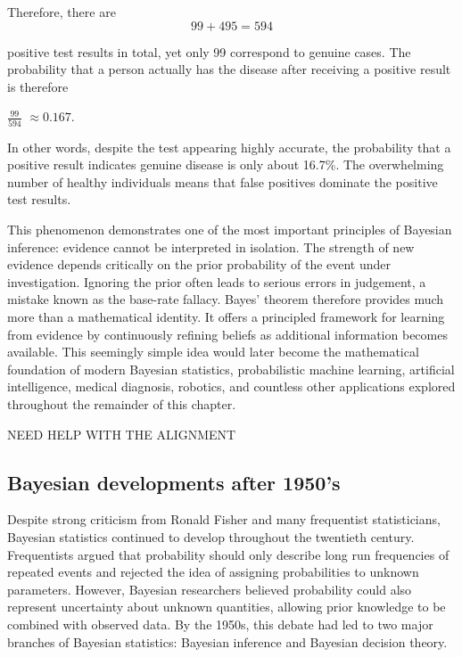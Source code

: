 Therefore, there are
\begin{equation}
    99+495=594    
\end{equation}

positive test results in total, yet only 99 correspond to genuine cases.
The probability that a person actually has the disease after receiving a positive result is therefore

$\frac{99}{594}$
$\approx0.167.$

In other words, despite the test appearing highly accurate, the probability that a positive result indicates genuine disease is only about 16.7\%. The overwhelming number of healthy individuals means that false positives dominate the positive test results.



This phenomenon demonstrates one of the most important principles of Bayesian inference: evidence cannot be interpreted in isolation.
The strength of new evidence depends critically on the prior probability of the event under investigation. 
Ignoring the prior often leads to serious errors in judgement, a mistake known as the base-rate fallacy.
Bayes' theorem therefore provides much more than a mathematical identity.
It offers a principled framework for learning from evidence by continuously refining beliefs as additional information becomes available. 
This seemingly simple idea would later become the mathematical foundation of modern Bayesian statistics, probabilistic machine learning, artificial intelligence, medical diagnosis, robotics, and countless other applications explored throughout the remainder of this chapter.

NEED HELP WITH THE ALIGNMENT



\subsection{Bayesian developments after 1950's} 
Despite strong criticism from Ronald Fisher and many frequentist statisticians, Bayesian statistics continued to develop throughout the twentieth century. Frequentists argued that probability should only describe long run frequencies of repeated events and rejected the idea of assigning probabilities to unknown parameters. However, Bayesian researchers believed probability could also represent uncertainty about unknown quantities, allowing prior knowledge to be combined with observed data. By the 1950s, this debate had led to two major branches of Bayesian statistics: Bayesian inference and Bayesian decision theory.

